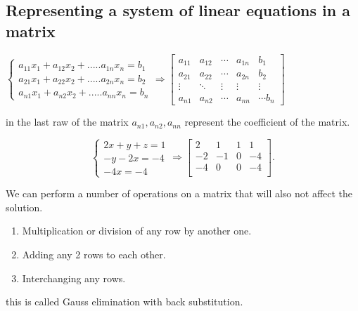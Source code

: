 \documentclass{article}
\begin{document}
\subsection{Representing a system of linear equations in a matrix }

$\begin{cases}
    a_{11}x_1+a_{12}x_2+.....a_{1n}x_n=b_1\\
    a_{21}x_1+a_{22}x_2+.....a_{2n}x_n=b_2\\
    a_{n1}x_1+a_{n2}x_2+.....a_{nn}x_n=b_n 
\end{cases} \Rightarrow
\begin{bmatrix}   
            a_{11} & a_{12} & \cdots & a_{1n} & b_1 \\
            a_{21} & a_{22} & \cdots & a_{2n} & b_2 \\
            \vdots & \ddots & \vdots & \vdots & \vdots \\
            a_{n1} & a_{n2} & \cdots & a_{nn} & \cdots b_n
\end{bmatrix}$

in the last raw of the matrix  $a_{n1} ,a_{n2} , a_{nn}$ represent the coefficient of the matrix.
\begin{example}
    \[
         \begin{cases}
            2x+y+z=1\\ -y-2x=-4\\ -4x=-4
         \end{cases} 
    \Rightarrow
            \begin{bmatrix}
                 2&1&1&1\\
                -2&-1&0&-4\\
                -4&0&0&-4\\
            \end{bmatrix} 
   .\]
\end{example}
We can perform a number of operations on a matrix that will also not affect the solution.
               \begin{enumerate}   
                   \item Multiplication or division of any row by another one. 
                   \item Adding any 2 rows to each other.
                   \item Interchanging any rows.
               \end{enumerate}
\begin{note}
    this is called Gauss elimination with back substitution.
\end{note}
\end{document}

